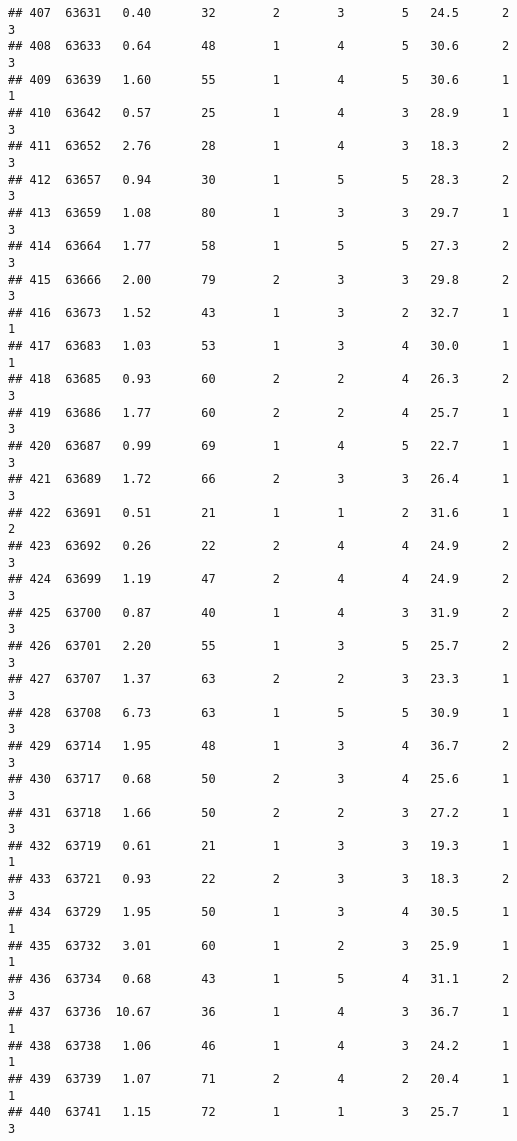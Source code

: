 \documentclass[
]{article}
\begin{document}
\begin{verbatim}
## 407  63631   0.40       32        2        3        5   24.5      2      3
## 408  63633   0.64       48        1        4        5   30.6      2      3
## 409  63639   1.60       55        1        4        5   30.6      1      1
## 410  63642   0.57       25        1        4        3   28.9      1      3
## 411  63652   2.76       28        1        4        3   18.3      2      3
## 412  63657   0.94       30        1        5        5   28.3      2      3
## 413  63659   1.08       80        1        3        3   29.7      1      3
## 414  63664   1.77       58        1        5        5   27.3      2      3
## 415  63666   2.00       79        2        3        3   29.8      2      3
## 416  63673   1.52       43        1        3        2   32.7      1      1
## 417  63683   1.03       53        1        3        4   30.0      1      1
## 418  63685   0.93       60        2        2        4   26.3      2      3
## 419  63686   1.77       60        2        2        4   25.7      1      3
## 420  63687   0.99       69        1        4        5   22.7      1      3
## 421  63689   1.72       66        2        3        3   26.4      1      3
## 422  63691   0.51       21        1        1        2   31.6      1      2
## 423  63692   0.26       22        2        4        4   24.9      2      3
## 424  63699   1.19       47        2        4        4   24.9      2      3
## 425  63700   0.87       40        1        4        3   31.9      2      3
## 426  63701   2.20       55        1        3        5   25.7      2      3
## 427  63707   1.37       63        2        2        3   23.3      1      3
## 428  63708   6.73       63        1        5        5   30.9      1      3
## 429  63714   1.95       48        1        3        4   36.7      2      3
## 430  63717   0.68       50        2        3        4   25.6      1      3
## 431  63718   1.66       50        2        2        3   27.2      1      3
## 432  63719   0.61       21        1        3        3   19.3      1      1
## 433  63721   0.93       22        2        3        3   18.3      2      3
## 434  63729   1.95       50        1        3        4   30.5      1      1
## 435  63732   3.01       60        1        2        3   25.9      1      1
## 436  63734   0.68       43        1        5        4   31.1      2      3
## 437  63736  10.67       36        1        4        3   36.7      1      1
## 438  63738   1.06       46        1        4        3   24.2      1      1
## 439  63739   1.07       71        2        4        2   20.4      1      1
## 440  63741   1.15       72        1        1        3   25.7      1      3

\end{verbatim}
\end{document}
